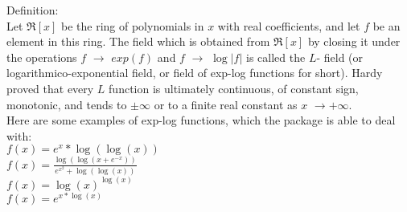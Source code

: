Definition: \\
Let $\Re[x]$ be the ring of polynomials in $x$ with real coefficients, and let $f$ be an element in this ring. The field which is obtained from $\Re[x]$ by closing it under the operations $f$ $\rightarrow$ $exp(f)$ and $f$ $\rightarrow$ $\log |f|$ is called the $L$- field (or logarithmico-exponential field, or field of exp-log functions for short).
\newline 
\newline
Hardy proved that every $L$ function is ultimately continuous, of constant sign, monotonic, and tends to $\pm \infty$ or to a finite real constant as $x$ $\rightarrow +\infty.$ \\

Here are some examples of exp-log functions, which the package is able to deal with: \\

$ f(x)=e^{x}*\log(\log(x))$ \\

$ f(x)=\frac{\log(\log(x+e^{-x}))}{e^{x^{2}}+\log(\log(x))} $ \\

$ f(x)=\log(x)^{\log(x)} $ \\

$ f(x)=e^{x*\log(x)} $ \\

\pagebreak
